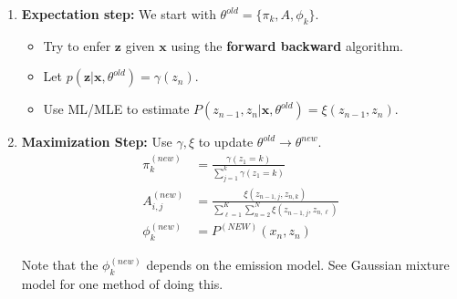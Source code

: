 \documentclass[a4paper,12pt]{report}
\begin{document}
\begin{enumerate}
\item \textbf{Expectation step:} We start with $\theta^{old} = \{\pi_k, A, \phi_k\}$. 
\begin{itemize}
\item Try to enfer $\pmb z$ given $\pmb x$ using the \textbf{forward backward} algorithm.
\item Let $p(\pmb z | \pmb x, \theta^{old}) = \gamma(z_n)$. 
\item Use ML/MLE to estimate $P(z_{n-1}, z_n | \pmb x, \theta^{old}) = \xi(z_{n-1}, z_n)$.
\end{itemize}

\item \textbf{Maximization Step:} Use $\gamma, \xi$ to update $\theta^{old}\to \theta^{new}$.
\begin{equation}
\begin{split}
\pi_k^{(new)} &= \frac{\gamma(z_1 = k)}{\sum_{j=1}^{k} \gamma(z_1 = k)} \\
A_{i,j}^{(new)} &= \frac{\xi(z_{n-1,j}, z_{n,k})}{\sum_{\ell=1}^{K} \sum_{n=2}^{N} \xi(z_{n-1,j}, z_{n,\ell})} \\
\phi_k^{(new)} &= P^{(NEW)} (x_n, z_n)
\end{split}
\end{equation}

Note that the $\phi_k^{(new)}$ depends on the emission model. See Gaussian mixture model for one method of doing this.


\end{enumerate}
\end{document}
